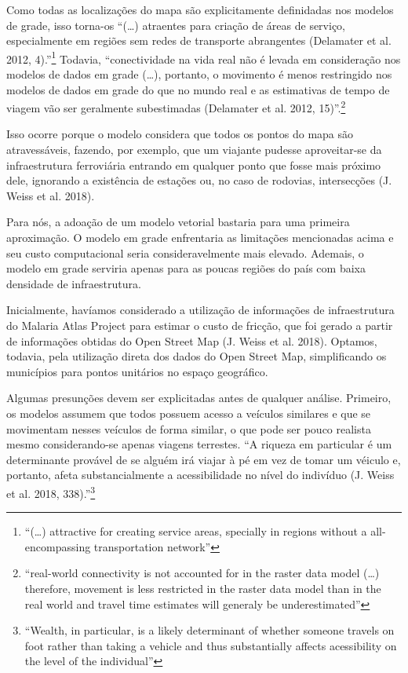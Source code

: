 \documentclass[]{article}
\let\rmarkdownfootnote\footnote%
\def\footnote{\protect\rmarkdownfootnote}
\begin{document}
Como todas as localizações do mapa são explicitamente definidadas nos
modelos de grade, isso torna-os ``(\ldots{}) atraentes para criação de
áreas de serviço, especialmente em regiões sem redes de transporte
abrangentes (Delamater et al. 2012, 4).''\footnote{``(\ldots{})
  attractive for creating service areas, specially in regions without a
  all-encompassing transportation network''} Todavia, ``conectividade na
vida real não é levada em consideração nos modelos de dados em grade
(\ldots{}), portanto, o movimento é menos restringido nos modelos de
dados em grade do que no mundo real e as estimativas de tempo de viagem
vão ser geralmente subestimadas (Delamater et al. 2012, 15)''.\footnote{``real-world
  connectivity is not accounted for in the raster data model (\ldots{})
  therefore, movement is less restricted in the raster data model than
  in the real world and travel time estimates will generaly be
  underestimated''}

Isso ocorre porque o modelo considera que todos os pontos do mapa são
atravessáveis, fazendo, por exemplo, que um viajante pudesse
aproveitar-se da infraestrutura ferroviária entrando em qualquer ponto
que fosse mais próximo dele, ignorando a existência de estações ou, no
caso de rodovias, intersecções (J. Weiss et al. 2018).

Para nós, a adoação de um modelo vetorial bastaria para uma primeira
aproximação. O modelo em grade enfrentaria as limitações mencionadas
acima e seu custo computacional seria consideravelmente mais elevado.
Ademais, o modelo em grade serviria apenas para as poucas regiões do
país com baixa densidade de infraestrutura.

Inicialmente, havíamos considerado a utilização de informações de
infraestrutura do Malaria Atlas Project para estimar o custo de fricção,
que foi gerado a partir de informações obtidas do Open Street Map (J.
Weiss et al. 2018). Optamos, todavia, pela utilização direta dos dados
do Open Street Map, simplificando os municípios para pontos unitários no
espaço geográfico.

Algumas presunções devem ser explicitadas antes de qualquer análise.
Primeiro, os modelos assumem que todos possuem acesso a veículos
similares e que se movimentam nesses veículos de forma similar, o que
pode ser pouco realista mesmo considerando-se apenas viagens terrestes.
``A riqueza em particular é um determinante provável de se alguém irá
viajar à pé em vez de tomar um véiculo e, portanto, afeta
substancialmente a acessibilidade no nível do indivíduo (J. Weiss et al.
2018, 338).''\footnote{``Wealth, in particular, is a likely determinant
  of whether someone travels on foot rather than taking a vehicle and
  thus substantially affects acessibility on the level of the
  individual''}
\end{document}
